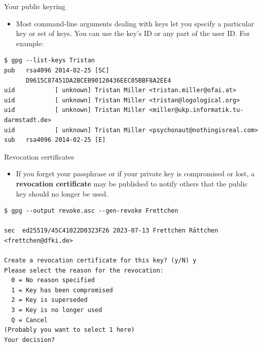 \documentclass[
mode=present,
paper=smartboard,
size=20pt,
]{powerdot}
\newcommand\vsp{\vspace{-16mm}}
\begin{document}
\begin{slide}[method=direct,toc=]{Your public keyring}
  \begin{itemize}
  \item Most command-line arguments dealing with keys let you specify
    a particular key or set of keys.  You can use the key's ID or any
    part of the user ID.  For example:
  \end{itemize}
\begin{verbatim}
$ gpg --list-keys Tristan
pub   rsa4096 2014-02-25 [SC]
      D9615C87451DA2BCEB90120436EEC05BBF8A2EE4
uid           [ unknown] Tristan Miller <tristan.miller@ofai.at>
uid           [ unknown] Tristan Miller <tristan@logological.org>
uid           [ unknown] Tristan Miller <miller@ukp.informatik.tu-darmstadt.de>
uid           [ unknown] Tristan Miller <psychonaut@nothingisreal.com>
sub   rsa4096 2014-02-25 [E]
\end{verbatim}
\end{slide}

\begin{slide}[method=direct]{Revocation certificates}
  \begin{itemize}
  \item If you forget your passphrase or if your private key is
    compromised or lost, a \textbf{revocation certificate} may be
    published to notify others that the public key should no longer be
    used.
  \end{itemize}
\vsp
\begin{verbatim}
$ gpg --output revoke.asc --gen-revoke Frettchen

sec  ed25519/45C41022D0323F26 2023-07-13 Frettchen Rättchen <frettchen@dfki.de>

Create a revocation certificate for this key? (y/N) y
Please select the reason for the revocation:
  0 = No reason specified
  1 = Key has been compromised
  2 = Key is superseded
  3 = Key is no longer used
  Q = Cancel
(Probably you want to select 1 here)
Your decision? 
\end{verbatim}
\end{slide}
\end{document}
